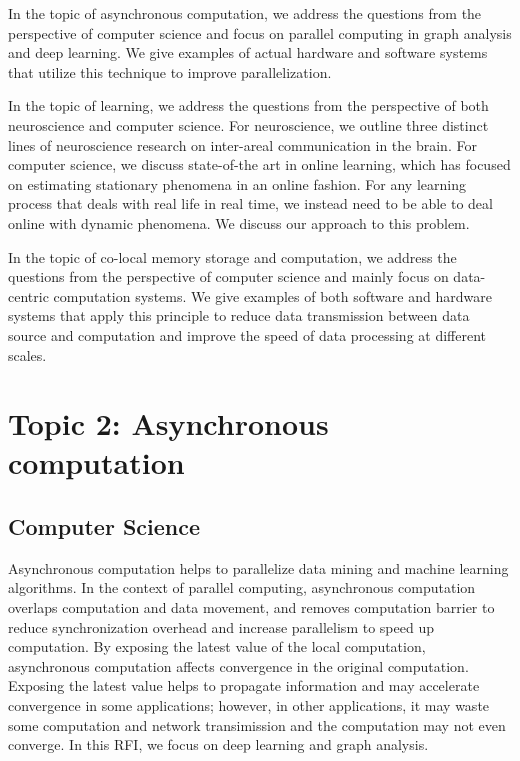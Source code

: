\documentclass[12pt]{report}
\begin{document}
In the topic of asynchronous computation, we address the questions from
the perspective of computer science and focus on parallel computing in graph
analysis and deep learning. We give examples of actual hardware and software
systems that utilize this technique to improve parallelization.

In the topic of learning, we address the questions from the perspective of
both neuroscience and computer science. For neuroscience, we outline three
distinct lines of neuroscience research on inter-areal communication in the brain.
For computer science, we discuss state-of-the art in online learning, which has
focused on estimating stationary phenomena in an online fashion. For any learning
process that deals with real life in real time, we instead need to be able to
deal online with dynamic phenomena. We discuss our approach to this problem.

In the topic of co-local memory storage and computation, we address
the questions from the perspective of computer science and mainly focus on
data-centric computation systems. We give examples of both software and
hardware systems that apply this principle to reduce data transmission between
data source and computation and improve the speed of data processing at
different scales.

\newpage

\section*{Topic 2: Asynchronous computation}

\subsection*{Computer Science}

Asynchronous computation helps to parallelize data mining and machine learning
algorithms. In the context of parallel computing, asynchronous computation
overlaps computation and data movement, and removes computation barrier to
reduce synchronization
overhead and increase parallelism to speed up computation. By exposing
the latest value of the local computation, asynchronous computation affects
convergence in the original computation. Exposing the latest value helps to
propagate information and may accelerate convergence in some applications;
however, in other applications, it may waste some computation and network
transimission and the computation may not even converge. In this RFI, we
focus on deep learning and graph analysis.
\end{document}
